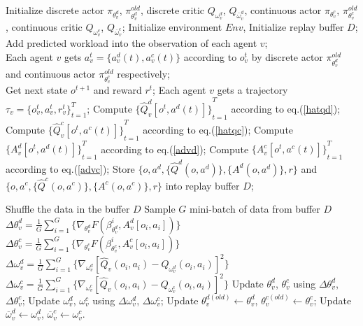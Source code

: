 \documentclass[lettersize,journal]{IEEEtran}
\begin{document}
\begin{minipage}{0.45\textwidth}
\begin{algorithm}[H]
\caption{Hybrid-MAPPO Algorithm for Avatar Task Pre-migration}
\label{alg:algorithm}
\begin{algorithmic}[1] %
\STATE Initialize discrete actor $\pi_{\theta_v^d}$, $\pi_{\theta_v^d}^{old}$, discrete critic $Q_{\omega_v^d}$, $Q_{\bar{\omega}_v^d}$, continuous actor $\pi_{\theta_v^c}$, $\pi_{\theta_v^c}^{old}$, continuous critic $Q_{\omega_v^c}$, $Q_{{\overline{\omega}}_v^c}$;
\STATE Initialize environment $Env$, Initialize replay buffer $D$;
\STATE Add predicted workload into the observation of each agent $v$;\\
\STATE Each agent $v$ gets $a_v^t = \{ a_v^d(t),a_v^c(t)\}$ according to $o_v^t$ by discrete actor $\pi_{\theta_v^d}^{old}$ and continuous actor $\pi_{\theta_v^c}^{old}$ respectively;\\
\STATE Get next state $o^{t+1}$ and reward $r^t$;
\ENDFOR
\STATE Each agent $v$ gets a trajectory $\tau_v=\{o_v^t,a_v^t,r_v^t\}_{t=1}^{T}$;
\STATE Compute ${\{\hat{Q}_v^d[o^t,a^d(t)]\}}_{t=1}^{T}$ according to eq.(\ref{hatqd});
\STATE Compute ${\{\hat{Q}_v^c[o^t,a^c(t)]\}}_{t=1}^{T}$ according to eq.(\ref{hatqc});
\STATE Compute ${\{A_v^d[o^t,a^d(t)]\}}_{t=1}^{T}$ according to eq.(\ref{advd});
\STATE Compute ${\{A_v^c[o^t,a^c(t)]\}}_{t=1}^{T}$ according to eq.(\ref{advc});
\STATE Store ${\{o,a^d,\{\hat{Q}^d(o,a^d)\},\{A^d(o,a^d)\},r\}}$ and ${\{o,a^c,\{\hat{Q}^c(o,a^c)\},\{A^c(o,a^c)\},r\}}$ into replay buffer $D$;

\STATE Shuffle the data in the buffer $D$
\STATE Sample $G$ mini-batch of data from buffer $D$ 
\STATE $\Delta\theta_v^d=\frac{1}{G}\sum_{i=1}^G\{{\nabla}_{\theta_v^d}F(\beta_{\theta_v^d}^i,A_v^d[o_i,a_i])\}$
\STATE $\Delta\theta_v^c=\frac{1}{G}\sum_{i=1}^G\{{\nabla}_{\theta_v^c}F(\beta_{\theta_v^c}^i,A_v^c[o_i,a_i])\}$
\STATE $\Delta\omega_v^d=\frac{1}{G}\sum_{i=1}^G\{{\nabla}_{\omega_v^d}[\hat{Q}_v(o_i,a_i)-Q_{\omega_v^d}(o_i,a_i)]^2\}$
\STATE $\Delta\omega_v^c=\frac{1}{G}\sum_{i=1}^G\{{\nabla}_{\omega_v^c}[\hat{Q}_v(o_i,a_i)-Q_{\omega_v^c}(o_i,a_i)]^2\}$
\ENDFOR
\STATE Update $\theta_v^d$, $\theta_v^c$ using $\Delta\theta_v^d$, $\Delta\theta_v^c$;
\STATE Update $\omega_v^d$, $\omega_v^c$ using $\Delta\omega_v^d$, $\Delta\omega_v^c$;
\ENDFOR
\ENDFOR
\STATE Update $\theta_v^{d(old)}\xleftarrow{} \theta_v^d $, $\theta_v^{c(old)}\xleftarrow{} \theta_v^c $;
\STATE Update $\overline{\omega}_v^d\xleftarrow{}\omega_v^d$, $\overline{\omega}_v^c\xleftarrow{}\omega_v^c$.
\ENDFOR
\end{algorithmic}
\end{algorithm}
\vspace{0.05cm}
\end{minipage}
\end{document}
